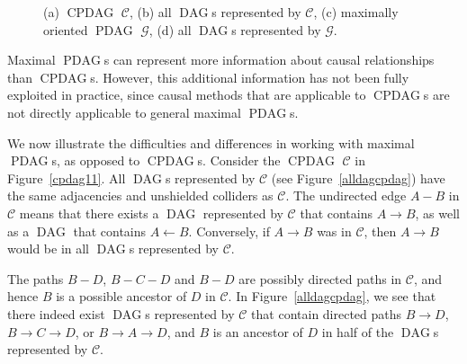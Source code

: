 \documentclass[letterpaper]{article}
\theoremstyle{definition}
\theoremstyle{remark}
\DeclareMathOperator{\PDAG}{PDAG}
\DeclareMathOperator{\CPDAG}{CPDAG}
\DeclareMathOperator{\DAG}{DAG}
\newcommand{\mpdag}{maximal $\PDAG$}
\newcommand{\Mpdag}{Maximal $\PDAG$}
\newcommand{\g}[1][G]{\mathcal{#1}}
\begin{document}
\begin{figure}[!tb]
\begin{subfigure}{.4\columnwidth}
\caption{}
  \label{mpdag11}
\end{subfigure}
\unskip
\vrule
\hspace{0.5cm}
\begin{subfigure}{.5\columnwidth}
\caption{}
\label{alldagmpdag}
\end{subfigure}
\caption{(a) $\CPDAG$ $\g[C]$, (b) all $\DAG$s represented by $\g[C]$, (c) maximally oriented $\PDAG$ $\g$, (d) all $\DAG$s represented by $\g$.}
\label{fig:example_meekgraph11}
\end{figure}

\Mpdag{}s can represent more information about causal relationships than $\CPDAG$s.
However, this additional information has not been fully exploited in practice, since causal methods that are applicable to $\CPDAG$s are not directly applicable to general \mpdag{}s.

We now illustrate the difficulties and differences in working with \mpdag{}s, as opposed to
$\CPDAG$s.
Consider the $\CPDAG$ $\g[C]$ in Figure~\ref{cpdag11}. 
All $\DAG$s represented by $\g[C]$ (see Figure~\ref{alldagcpdag}) have the same adjacencies and unshielded colliders as $\g[C]$.
The undirected edge $A -B$ in $\g[C]$ means that there exists a $\DAG$ represented by $\g[C]$ that contains $A \rightarrow B$, as well as a $\DAG$ that contains $ A \leftarrow B$. Conversely, if $A \rightarrow B$ was in $\g[C]$, then $A \rightarrow B$ would be in all $\DAG$s represented by $\g[C]$.

The paths $B -D$, $B-C-D$ and $B-D$ are possibly directed paths in $\g[C]$, and hence $B$ is a possible ancestor of $D$ in $\g[C]$.
In Figure~\ref{alldagcpdag}, we see that there indeed exist $\DAG$s represented by $\g[C]$ that contain directed paths $B \rightarrow D$, $B \rightarrow C \rightarrow D$, or $B \rightarrow A \rightarrow D$, and $B$ is an ancestor of $D$ in half of the $\DAG$s represented by $\g[C]$.
\end{document}
